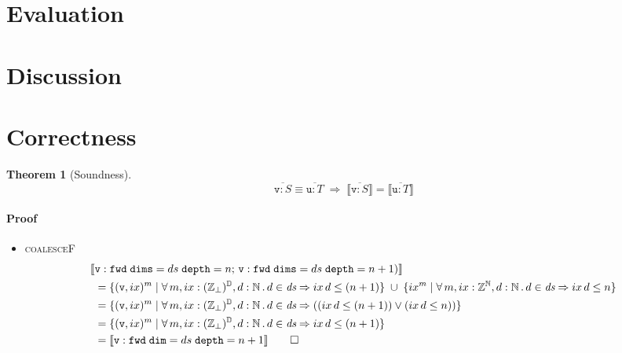 \documentclass[9pt]{sigplanconf}
\newcounter{block}
\theoremstyle{definition}
\newtheorem{theorem}[block]{Theorem}
\newcommand{\interp}[1]{\llbracket{#1}\rrbracket}
\begin{document}
\section{Evaluation}
\label{sec:evaluation}

\section{Discussion}
\label{sec:discussion}





\onecolumn
\appendix

\section{Correctness}


\begin{theorem}[Soundness]
\[
\overline{\texttt{v} : S}\equiv \overline{\texttt{u} : T}
\; \Rightarrow \;
\interp{\overline{\texttt{v} : S}} = \interp{\overline{\texttt{u} : T}}
\]
\end{theorem}

\paragraph{Proof}
\begin{itemize}
\item \textsc{coalesceF}
\begin{align*}
\llbracket & \texttt{v} : \texttt{fwd} \; \texttt{dims}=ds \; \texttt{depth}=n; \,
  \texttt{v} :  \texttt{fwd} \; \texttt{dims}=ds \;
  \texttt{depth}=n+1)\rrbracket \\
& =  \{ (\texttt{v}, ix)^m \mid \forall \, m, ix : \relix, d : \mathbb{N}
  \, . \, d \in \textit{ds} \Rightarrow ix \, d \leq (n+1) \} \; \cup \; \{ ix^m \mid \forall \, m, ix : \mathbb{Z}^{\mathbb{N}}, d : \mathbb{N}
  \, . \, d \in \textit{ds} \Rightarrow ix \, d \leq n \}\\
& =  \{ (\texttt{v}, ix)^m \mid \forall \, m, ix : \relix, d : \mathbb{N}
  \, . \, d \in \textit{ds} \Rightarrow ((ix \, d \leq (n+1)) \vee (ix \,
  d \leq n)) \} \\
& =  \{ (\texttt{v}, ix)^m \mid \forall \, m, ix : \relix, d : \mathbb{N}
  \, . \, d \in \textit{ds} \Rightarrow ix \, d \leq (n+1) \} \\
& = \interp{\texttt{v} : \texttt{fwd} \; \texttt{dim}=ds \;
  \texttt{depth}=n + 1} \qquad \Box
\end{align*}
\end{itemize}
\end{document}
